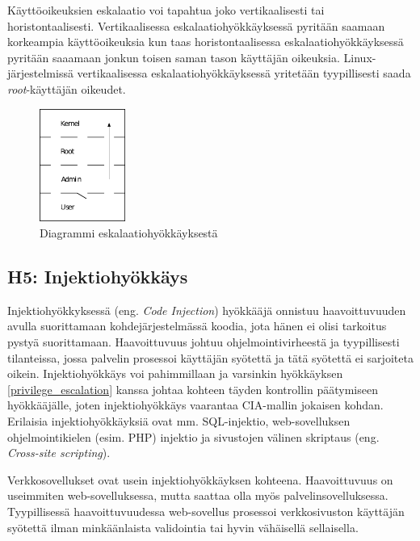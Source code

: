 Käyttöoikeuksien eskalaatio voi tapahtua joko vertikaalisesti tai horistontaalisesti. Vertikaalisessa eskalaatiohyökkäyksessä pyritään saamaan korkeampia käyttöoikeuksia kun taas horistontaalisessa eskalaatiohyökkäyksessä pyritään saaamaan jonkun toisen saman tason käyttäjän oikeuksia. Linux-järjestelmissä vertikaalisessa eskalaatiohyökkäyksessä yritetään tyypillisesti saada \textit{root}-käyttäjän oikeudet.~\cite{ciampa2012security+}

\begin{figure}
\centering \includegraphics[width=0.25\textwidth]{kuvat/privilege_escalation.png}
\caption{Diagrammi eskalaatiohyökkäyksestä~\cite{wikipedia:privilege_escalation}}
\label{privilege_escalation_diagram} 
\end{figure}

\subsection{H5: Injektiohyökkäys}
Injektiohyökkyksessä (eng. \textit{Code Injection}) hyökkääjä onnistuu haavoittuvuuden avulla suorittamaan kohdejärjestelmässä koodia, jota hänen ei olisi tarkoitus pystyä suorittamaan. Haavoittuvuus johtuu ohjelmointivirheestä ja tyypillisesti tilanteissa, jossa palvelin prosessoi käyttäjän syötettä ja tätä syötettä ei sarjoiteta oikein. Injektiohyökkäys voi pahimmillaan ja varsinkin hyökkäyksen \ref{privilege_escalation} kanssa johtaa kohteen täyden kontrollin päätymiseen hyökkääjälle, joten injektiohyökkäys vaarantaa CIA-mallin jokaisen kohdan. Erilaisia injektiohyökkäyksiä ovat mm. SQL-injektio, web-sovelluksen ohjelmointikielen (esim. PHP) injektio ja sivustojen välinen skriptaus (eng. \textit{Cross-site scripting}).

Verkkosovellukset ovat usein injektiohyökkäyksen kohteena. Haavoittuvuus on useimmiten web-sovelluksessa, mutta saattaa olla myös palvelinsovelluksessa. Tyypillisessä haavoittuvuudessa web-sovellus prosessoi verkkosivuston käyttäjän syötettä ilman minkäänlaista validointia tai hyvin vähäisellä sellaisella.~\cite{mcdonald2020web}

